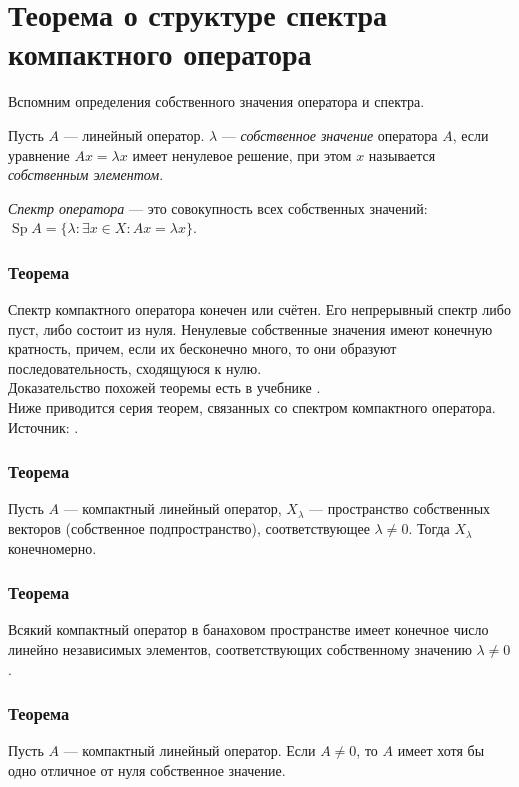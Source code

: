 \section{Теорема о структуре спектра компактного оператора}
\label{sec:q-45}

Вспомним определения собственного значения оператора и спектра.

Пусть $A$ --- линейный оператор. $\lambda$ --- \textit{собственное значение} оператора $A$, если уравнение $Ax = \lambda x$ имеет ненулевое решение, при этом $x$ называется \textit{собственным элементом}.

\textit{Спектр оператора} --- это совокупность всех собственных значений: $\operatorname{Sp}A = \{\lambda : \exists x \in X : Ax = \lambda x\}$.

\subsubsection*{Теорема}
Спектр компактного оператора конечен или счётен. Его непрерывный спектр либо пуст, либо состоит из нуля. Ненулевые собственные значения имеют конечную кратность, причем, если их бесконечно много, то они образуют последовательность, сходящуюся к нулю.\\
Доказательство похожей теоремы есть в учебнике \cite[с.~244]{kolmogorov}.\\

Ниже приводится серия теорем, связанных со спектром компактного оператора. Источник: \cite{pnu-compact-operators}.

\subsubsection*{Теорема}
Пусть $A$ --- компактный линейный оператор, $X_\lambda$ --- пространство собственных векторов (собственное подпространство), соответствующее $\lambda \neq 0$. Тогда $X_\lambda$ конечномерно.

\subsubsection*{Теорема}
Всякий компактный оператор в банаховом пространстве имеет конечное число линейно независимых элементов, соответствующих собственному
значению $\lambda \neq 0$.

\subsubsection*{Теорема}
Пусть $A$ --- компактный линейный оператор. Если $A \neq 0$, то $A$ имеет хотя бы одно отличное от нуля собственное значение.

